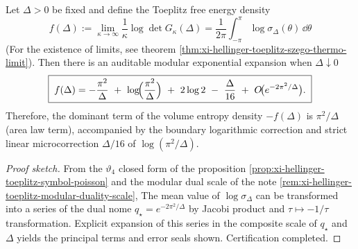\begin{theorem}\label{thm:xi-hellinger-toeplitz-free-energy-area-law}
Let \(\Delta>0\) be fixed and define the Toeplitz free energy density
\[
f(\Delta):=\lim_{\kappa\to\infty}\frac{1}{\kappa}\log\det G_\kappa(\Delta)
=\frac{1}{2\pi}\int_{-\pi}^{\pi}\log\sigma_\Delta(\theta)\,\dd\theta
\]
(For the existence of limits, see theorem \ref{thm:xi-hellinger-toeplitz-szego-thermo-limit}).
Then there is an auditable modular exponential expansion when \(\Delta\downarrow0\)
\[
\boxed{\;
f(\Delta)= -\frac{\pi^{2}}{\Delta}\ +\ \log\!\Bigl(\frac{\pi^{2}}{\Delta}\Bigr)\ +\ 2\log 2\ -\ \frac{\Delta}{16}\ +\ O\!\bigl(e^{-2\pi^{2}/\Delta}\bigr).\;}
\]
Therefore, the dominant term of the volume entropy density \(-f(\Delta)\) is \(\pi^2/\Delta\) (area law term), accompanied by the boundary logarithmic correction and strict linear microcorrection \(\Delta/16\) of \(\log(\pi^2/\Delta)\).
\end{theorem}
\begin{proof}[Proof sketch]
From the \(\vartheta_4\) closed form of the proposition \ref{prop:xi-hellinger-toeplitz-symbol-poisson} and the modular dual scale of the note \ref{rem:xi-hellinger-toeplitz-modular-duality-scale},
The mean value of \(\log\sigma_\Delta\) can be transformed into a series of the dual nome \(q_\star=e^{-2\pi^2/\Delta}\) by Jacobi product and \(\tau\mapsto-1/\tau\) transformation.
Explicit expansion of this series in the composite scale of \(q_\star\) and \(\Delta\) yields the principal terms and error seals shown. Certification completed.
\end{proof}

